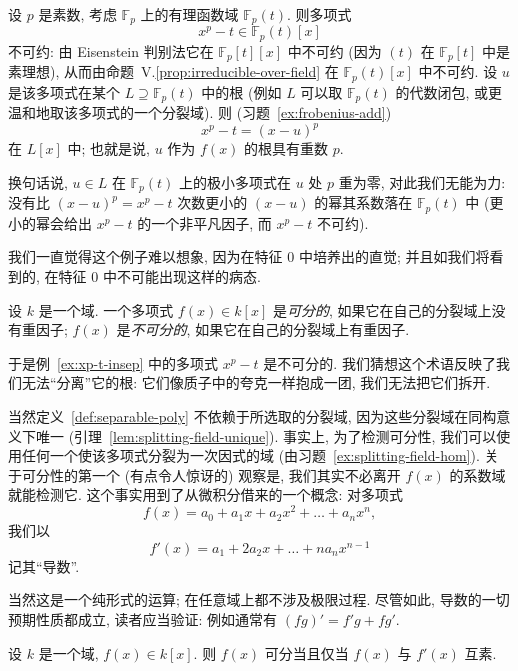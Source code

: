 \begin{example}\label{ex:xp-t-insep}
设 $p$ 是素数, 考虑 $\mathbb{F}_p$ 上的有理函数域 $\mathbb{F}_p(t)$. 则多项式
\[
x^p-t\in\mathbb{F}_p(t)[x]
\]
不可约: 由 Eisenstein 判别法它在 $\mathbb{F}_p[t][x]$ 中不可约 (因为 $(t)$ 在 $\mathbb{F}_p[t]$ 中是素理想), 从而由命题~V.\ref{prop:irreducible-over-field} 在 $\mathbb{F}_p(t)[x]$ 中不可约. 设 $u$ 是该多项式在某个 $L\supseteq\mathbb{F}_p(t)$ 中的根 (例如 $L$ 可以取 $\mathbb{F}_p(t)$ 的代数闭包, 或更温和地取该多项式的一个分裂域). 则 (习题~\ref{ex:frobenius-add})
\[
x^p-t=(x-u)^p
\]
在 $L[x]$ 中; 也就是说, $u$ 作为 $f(x)$ 的根具有重数 $p$.

换句话说, $u\in L$ 在 $\mathbb{F}_p(t)$ 上的极小多项式在 $u$ 处 $p$ 重为零, 对此我们无能为力: 没有比 $(x-u)^p=x^p-t$ 次数更小的 $(x-u)$ 的幂其系数落在 $\mathbb{F}_p(t)$ 中 (更小的幂会给出 $x^p-t$ 的一个非平凡因子, 而 $x^p-t$ 不可约).

我们一直觉得这个例子难以想象, 因为在特征 $0$ 中培养出的直觉; 并且如我们将看到的, 在特征 $0$ 中不可能出现这样的病态.
\end{example}

\begin{definition}\label{def:separable-poly}
设 $k$ 是一个域. 一个多项式 $f(x)\in k[x]$ 是\emph{可分的}, 如果它在自己的分裂域上没有重因子; $f(x)$ 是\emph{不可分的}, 如果它在自己的分裂域上有重因子.
\end{definition}

于是例~\ref{ex:xp-t-insep} 中的多项式 $x^p-t$ 是不可分的. 我们猜想这个术语反映了我们无法``分离''它的根: 它们像质子中的夸克一样抱成一团, 我们无法把它们拆开.

当然定义~\ref{def:separable-poly} 不依赖于所选取的分裂域, 因为这些分裂域在同构意义下唯一 (引理~\ref{lem:splitting-field-unique}). 事实上, 为了检测可分性, 我们可以使用任何一个使该多项式分裂为一次因式的域 (由习题~\ref{ex:splitting-field-hom}). 关于可分性的第一个 (有点令人惊讶的) 观察是, 我们其实不必离开 $f(x)$ 的系数域就能检测它. 这个事实用到了从微积分借来的一个概念: 对多项式
\[
f(x)=a_0+a_1x+a_2x^2+\dots+a_nx^n,
\]
我们以
\[
f'(x)=a_1+2a_2x+\dots+na_nx^{n-1}
\]
记其``导数''.

当然这是一个纯形式的运算; 在任意域上都不涉及极限过程. 尽管如此, 导数的一切预期性质都成立, 读者应当验证: 例如通常有 $(fg)'=f'g+fg'$.

\begin{lemma}\label{lem:separable-gcd}
设 $k$ 是一个域, $f(x)\in k[x]$. 则 $f(x)$ 可分当且仅当 $f(x)$ 与 $f'(x)$ 互素.
\end{lemma}

